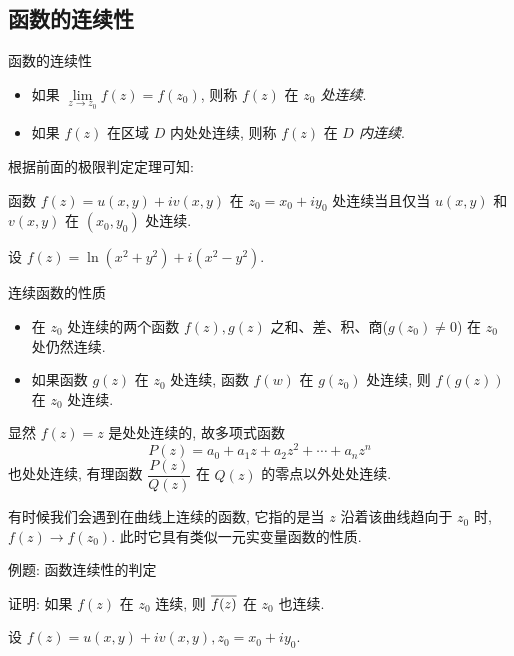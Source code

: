 \subsection{函数的连续性}
\begin{frame}{函数的连续性}
\onslide<+->
\begin{definition}
\begin{itemize}
\item 如果 $\lim\limits_{z\to z_0}f(z)=f(z_0)$, 则称 $f(z)$ 在 \emph{$z_0$ 处连续}.
\item 如果 $f(z)$ 在区域 $D$ 内处处连续, 则称 $f(z)$ 在 \emph{$D$ 内连续}.
\end{itemize}
\end{definition}
\onslide<+->
根据前面的极限判定定理可知:
\onslide<+->
\begin{theorem}
函数 $f(z)=u(x,y)+iv(x,y)$ 在 $z_0=x_0+iy_0$ 处连续当且仅当 $u(x,y)$ 和 $v(x,y)$ 在 $(x_0,y_0)$ 处连续.
\end{theorem}

\onslide<+->
\begin{example}
设 $f(z)=\ln(x^2+y^2)+i(x^2-y^2)$.
\end{example}
\end{frame}


\begin{frame}{连续函数的性质}
\onslide<+->
\begin{theorem}
\begin{itemize}
\item 在 $z_0$ 处连续的两个函数 $f(z),g(z)$ 之和、差、积、商($g(z_0)\neq 0$) 在 $z_0$ 处仍然连续.
\item 如果函数 $g(z)$ 在 $z_0$ 处连续, 函数 $f(w)$ 在 $g(z_0)$ 处连续, 则 $f(g(z))$ 在 $z_0$ 处连续.
\end{itemize}
\end{theorem}

\onslide<+->
显然 $f(z)=z$ 是处处连续的,
\onslide<+->
故多项式函数
\[P(z)=a_0+a_1z+a_2z^2+\cdots+a_nz^n\]
也处处连续,
\onslide<+->
有理函数 $\dfrac{P(z)}{Q(z)}$ 在 $Q(z)$ 的零点以外处处连续.

\onslide<+->
有时候我们会遇到在曲线上连续的函数, 它指的是当 $z$ 沿着该曲线趋向于 $z_0$ 时, $f(z)\to f(z_0)$.
\onslide<+->
此时它具有类似一元实变量函数的性质.
\end{frame}


\begin{frame}{例题: 函数连续性的判定}
\onslide<+->
\begin{example}
证明: 如果 $f(z)$ 在 $z_0$ 连续, 则 $\overline{f(z)}$ 在 $z_0$ 也连续.
\end{example}
\onslide<+->
\begin{proof*}
设 $f(z)=u(x,y)+iv(x,y),z_0=x_0+iy_0$.

\end{proof*}
\end{frame}


